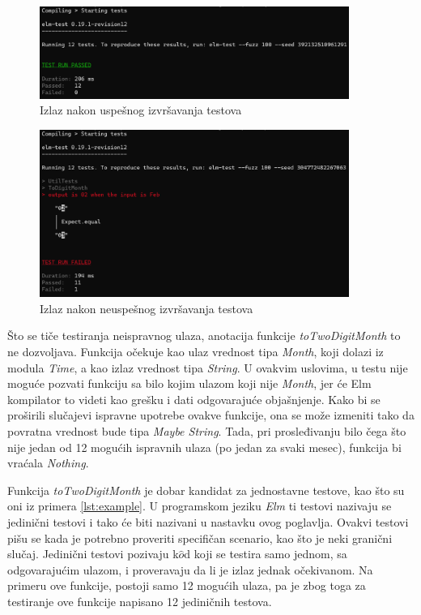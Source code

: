 \documentclass[12pt,oneside]{memoir}
\begin{document}
\begin{figure}[!ht]
  \centering
  \includegraphics[width=0.9\textwidth]{elmpass.png}
  \caption{Izlaz nakon uspešnog izvršavanja testova}
  \label{fig:elmpass}
\end{figure}

\begin{figure}[!ht]
  \centering
  \includegraphics[width=0.9\textwidth]{elmfail.png}
  \caption{Izlaz nakon neuspešnog izvršavanja testova}
  \label{fig:elmfail}
\end{figure}

\par Što se tiče testiranja neispravnog ulaza, anotacija funkcije \emph{toTwoDigitMonth} to ne dozvoljava. Funkcija očekuje kao ulaz vrednost tipa \emph{Month}, koji dolazi iz modula \emph{Time}, a kao izlaz vrednost tipa \emph{String}. U ovakvim uslovima, u testu nije moguće pozvati funkciju sa bilo kojim ulazom koji nije \emph{Month}, jer će Elm kompilator to videti kao grešku i dati odgovarajuće objašnjenje. Kako bi se proširili slučajevi ispravne upotrebe ovakve funkcije, ona se može izmeniti tako da povratna vrednost bude tipa \emph{Maybe String}. Tada, pri prosleđivanju bilo čega što nije jedan od 12 mogućih ispravnih ulaza (po jedan za svaki mesec), funkcija bi vraćala \emph{Nothing}.
\par Funkcija \emph{toTwoDigitMonth} je dobar kandidat za jednostavne testove, kao što su oni iz primera \ref{lst:example}. U programskom jeziku \emph{Elm} ti testovi nazivaju se jedinični testovi i tako će biti nazivani u nastavku ovog poglavlja. Ovakvi testovi pišu se kada je potrebno proveriti specifičan scenario, kao što je neki granični slučaj. Jedinični testovi pozivaju k$\hat{o}$d koji se testira samo jednom, sa odgovarajućim ulazom, i proveravaju da li je izlaz jednak očekivanom. Na primeru ove funkcije, postoji samo 12 mogućih ulaza, pa je zbog toga za testiranje ove funkcije napisano 12 jediničnih testova. 
\end{document}
